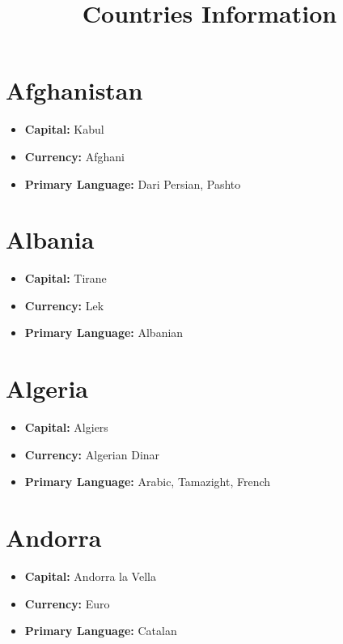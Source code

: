 \documentclass[a4paper,100pt,twoside]{book}
\title{\titlefont Countries Information}
\begin{document}
\maketitle
\section*{\Huge Afghanistan}
\vspace{5mm} %
\begin{itemize}
	\item \textbf{Capital:} Kabul
	\item \textbf{Currency:} Afghani
	\item \textbf{Primary Language:} Dari Persian, Pashto
\end{itemize}

\section*{\Huge Albania}
\vspace{5mm} %
\begin{itemize}
	\item \textbf{Capital:} Tirane
	\item \textbf{Currency:} Lek
	\item \textbf{Primary Language:} Albanian
\end{itemize}

\section*{\Huge Algeria}
\vspace{5mm} %
\begin{itemize}
	\item \textbf{Capital:} Algiers
	\item \textbf{Currency:} Algerian Dinar
	\item \textbf{Primary Language:} Arabic, Tamazight, French
\end{itemize}

\section*{\Huge Andorra}
\vspace{5mm} %
\begin{itemize}
	\item \textbf{Capital:} Andorra la Vella
	\item \textbf{Currency:} Euro
	\item \textbf{Primary Language:} Catalan
\end{itemize}
\end{document}
